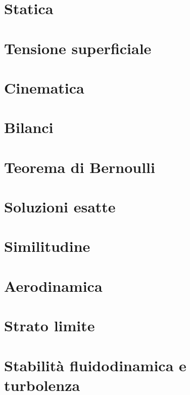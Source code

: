 \section{Statica}
\section{Tensione superficiale}
\section{Cinematica}
\section{Bilanci}
\section{Teorema di Bernoulli}
\section{Soluzioni esatte}
\section{Similitudine}
\section{Aerodinamica}
\section{Strato limite}
\section{Stabilità fluidodinamica e turbolenza}
